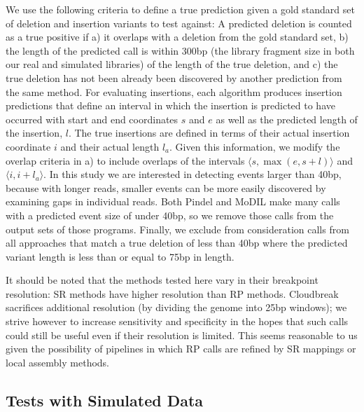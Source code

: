 \documentclass[11pt]{article}
\begin{document}
We use the following criteria to define a true prediction given a gold standard set of deletion and insertion variants to test against: A predicted deletion is counted as a true positive if a) it overlaps with a deletion from the gold standard set, b) the length of the predicted call is within 300bp (the library fragment size in both our real and simulated libraries) of the length of the true deletion, and c) the true deletion has not been already been discovered by another prediction from the same method. For evaluating insertions, each algorithm produces insertion predictions that define an interval in which the insertion is predicted to have occurred with start and end coordinates $s$ and $e$ as well as the predicted length of the insertion, $l$. The true insertions are defined in terms of their actual insertion coordinate $i$ and their actual length $l_a$. Given this information, we modify the overlap criteria in a) to include overlaps of the intervals $\langle s,\max{\left(e,s+l\right)} \rangle$ and $\langle i,i+l_a \rangle$. In this study we are interested in detecting events larger than 40bp, because with longer reads, smaller events can be more easily discovered by examining gaps in individual reads. Both Pindel and MoDIL make many calls with a predicted event size of under 40bp, so we remove those calls from the output sets of those programs. Finally, we exclude from consideration calls from all approaches that match a true deletion of less than 40bp where the predicted variant length is less than or equal to 75bp in length.

It should be noted that the methods tested here vary in their breakpoint resolution: SR methods have higher resolution than RP methods. Cloudbreak sacrifices additional resolution (by dividing the genome into 25bp windows); we strive however to increase sensitivity and specificity in the hopes that such calls could still be useful even if their resolution is limited. This seems reasonable to us given the possibility of pipelines in which RP calls are refined by SR mappings or local assembly methods.

\subsection{Tests with Simulated Data}
\end{document}
